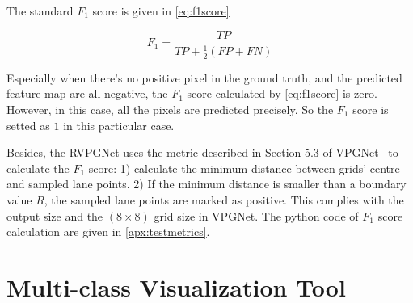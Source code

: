 \begin{spacing}{1.5}
The standard $F_1$ score is given in \autoref{eq:f1score}

\begin{equation}
\label{eq:f1score}
    F_1=\frac{TP}{TP+\frac{1}{2}(FP+FN)}
\end{equation}

Especially when there's no positive pixel in the ground truth, and the predicted feature map are all-negative, the $F_1$ score calculated by \autoref{eq:f1score} is zero. However, in this case, all the pixels are predicted precisely. So the $F_1$ score is setted as $1$ in this particular case.

Besides, the RVPGNet uses the metric described in Section 5.3 of VPGNet~\cite{lee2017vpgnet} to calculate the $F_1$ score: 1) calculate the minimum distance between grids' centre and sampled lane points. 2) If the minimum distance is smaller than a boundary value $R$, the sampled lane points are marked as positive. This complies with the output size and the $(8 \times 8)$ grid size in VPGNet. The python code of $F_1$ score calculation are given in \autoref{apx:testmetrics}.

\section{Multi-class Visualization Tool}
\label{sec:EX_multivisual}


\end{spacing}

